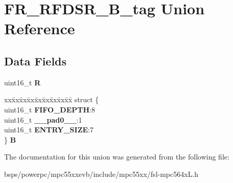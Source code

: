 \hypertarget{unionFR__RFDSR__16B__tag}{}\section{F\+R\+\_\+\+R\+F\+D\+S\+R\+\_\+B\+\_\+tag Union Reference}
\label{unionFR__RFDSR__16B__tag}
\subsection*{Data Fields}
\begin{DoxyCompactItemize}
\item 
\mbox{\label{unionFR__RFDSR__16B__tag_afda723bd978a6df2f26180f5a4e04657}} 
uint16\+\_\+t {\bfseries R}
\item 
\mbox{\label{unionFR__RFDSR__16B__tag_a52fcd0d8d8e6040206f7a6134c275cca}} 
\begin{tabbing}
xx\=xx\=xx\=xx\=xx\=xx\=xx\=xx\=xx\=\kill
struct \{\\
\>uint16\_t {\bfseries FIFO\_DEPTH}:8\\
\>uint16\_t {\bfseries \_\_pad0\_\_}:1\\
\>uint16\_t {\bfseries ENTRY\_SIZE}:7\\
\} {\bfseries B}\\

\end{tabbing}\end{DoxyCompactItemize}


The documentation for this union was generated from the following file\+:\begin{DoxyCompactItemize}
\item 
bsps/powerpc/mpc55xxevb/include/mpc55xx/fsl-\/mpc564x\+L.\+h\end{DoxyCompactItemize}
